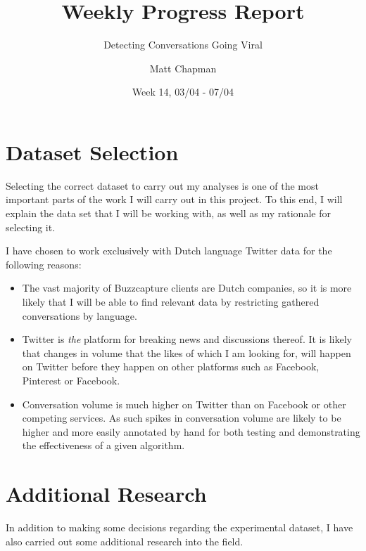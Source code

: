 \documentclass{mattreport}
\title{Weekly Progress Report}
\subtitle{Detecting Conversations Going Viral}
\date{Week 14, 03/04 - 07/04}
\author{Matt Chapman}
\begin{document}
\maketitle

\section{Dataset Selection}

Selecting the correct dataset to carry out my analyses is one of the most important parts of the work I will carry out in this project. To this end, I will explain the data set that I will be working with, as well as my rationale for selecting it.

I have chosen to work exclusively with Dutch language Twitter data for the following reasons:

\begin{itemize}
	\item The vast majority of Buzzcapture clients are Dutch companies, so it is more likely that I will be able to find relevant data by restricting gathered conversations by language.
	\item Twitter is \emph{the} platform for breaking news and discussions thereof. It is likely that changes in volume that the likes of which I am looking for, will happen on Twitter before they happen on other platforms such as Facebook, Pinterest or Facebook.
	\item Conversation volume is much higher on Twitter than on Facebook or other competing services. As such spikes in conversation volume are likely to be higher and more easily annotated by hand for both testing and demonstrating the effectiveness of a given algorithm.
\end{itemize}

\section{Additional Research}

In addition to making some decisions regarding the experimental dataset, I have also carried out some additional research into the field.

\newpage
\printbibliography
\end{document}
